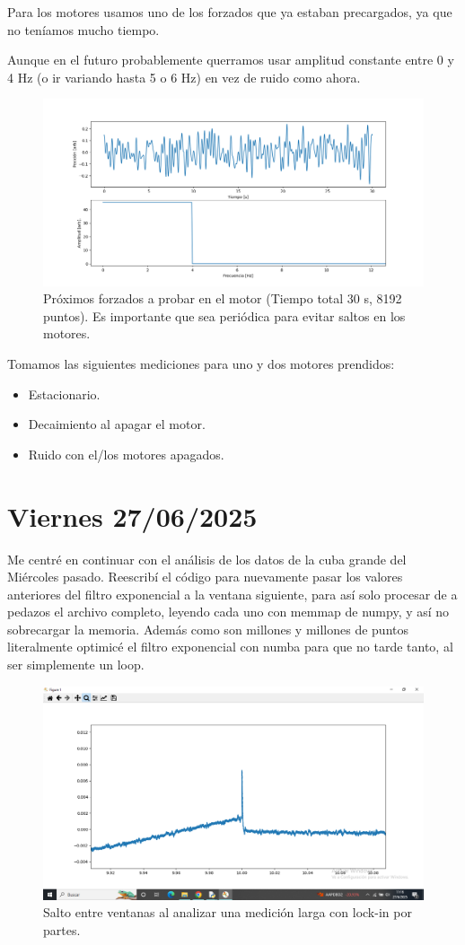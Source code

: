 Para los motores usamos uno de los forzados que ya estaban precargados, ya que no teníamos mucho tiempo. 

Aunque en el futuro probablemente querramos usar amplitud constante entre 0 y 4 Hz (o ir variando hasta 5 o 6 Hz) en vez de ruido como ahora.

\begin{figure}[th!]
	\centering
	\includegraphics[width=0.7065810257\linewidth]{Figures/23_06_2025/Amplitud_constante}
	\caption{Próximos forzados a probar en el motor (Tiempo total 30 s, 8192 puntos). Es importante que sea periódica para evitar saltos en los motores.} %
	\label{fig:amplitudconstante}
\end{figure}

Tomamos las siguientes mediciones para uno y dos motores prendidos: 
\begin{itemize}
	\item Estacionario. 
	\item Decaimiento al apagar el motor. 
	\item Ruido con el/los motores apagados.
\end{itemize}


\section{Viernes 27/06/2025}  
Me centré en continuar con el análisis de los datos de la cuba grande del Miércoles pasado. Reescribí el código para nuevamente pasar los valores anteriores del filtro exponencial a la ventana siguiente, para así solo procesar de a pedazos el archivo completo, leyendo cada uno con memmap de numpy, y así no sobrecargar la memoria. Además como son millones y millones de puntos literalmente optimicé el filtro exponencial con numba para que no tarde tanto, al ser simplemente un loop.            

\begin{figure}[th!]
	\centering
	\includegraphics[width=0.429567\linewidth]{Figures/23_06_2025/Salto_temporal_entre_ventanas}
	\caption{Salto entre ventanas al analizar una medición larga con lock-in por partes.}
	\label{fig:saltotemporalentreventanas}
\end{figure}


